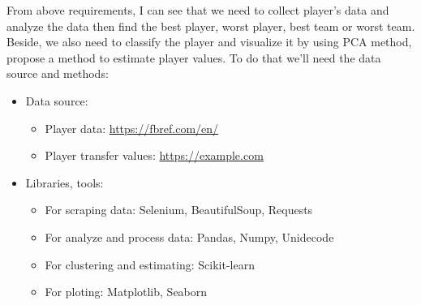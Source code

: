 \documentclass[a4paper,12pt]{article}
\begin{document}
From above requirements, I can see that we need to collect player's data and analyze the data then find the best player, worst player, best team or worst team. Beside, we also need to classify the player and visualize it by using PCA method, propose a method to estimate player values. To do that we'll need the data source and methods:

\begin{itemize}[leftmargin= 1cm]
    \item Data source:
        \begin{itemize}[label={}, leftmargin= 1cm]
            \item Player data: \url{https://fbref.com/en/}
            \item Player transfer values: \url{https://example.com}
        \end{itemize}
    \item Libraries, tools:
        \begin{itemize}[label= {}, leftmargin= 1cm]
            \item For scraping data: Selenium, BeautifulSoup, Requests
            \item For analyze and process data: Pandas, Numpy, Unidecode
            \item For clustering and estimating: Scikit-learn
            \item For ploting: Matplotlib, Seaborn
        \end{itemize}
\end{itemize}

\newpage
\end{document}
